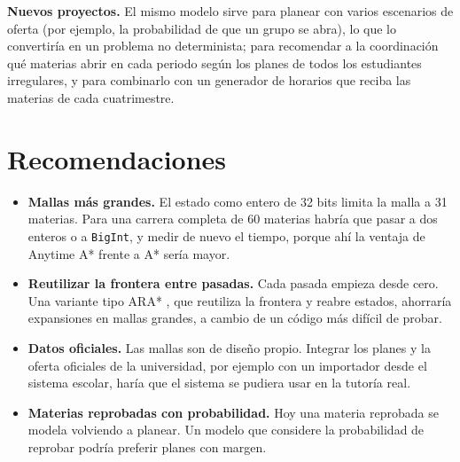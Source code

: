 \textbf{Nuevos proyectos.} El mismo modelo sirve para planear con varios escenarios de oferta (por ejemplo, la probabilidad de que un grupo se abra), lo que lo convertiría en un problema no determinista; para recomendar a la coordinación qué materias abrir en cada periodo según los planes de todos los estudiantes irregulares, y para combinarlo con un generador de horarios que reciba las materias de cada cuatrimestre.

\section{Recomendaciones}
\begin{itemize}
    \item \textbf{Mallas más grandes.} El estado como entero de 32 bits limita la malla a 31 materias. Para una carrera completa de 60 materias habría que pasar a dos enteros o a \texttt{BigInt}, y medir de nuevo el tiempo, porque ahí la ventaja de Anytime A* frente a A* sería mayor.
    \item \textbf{Reutilizar la frontera entre pasadas.} Cada pasada empieza desde cero. Una variante tipo ARA* \cite{likhachev2003}, que reutiliza la frontera y reabre estados, ahorraría expansiones en mallas grandes, a cambio de un código más difícil de probar.
    \item \textbf{Datos oficiales.} Las mallas son de diseño propio. Integrar los planes y la oferta oficiales de la universidad, por ejemplo con un importador desde el sistema escolar, haría que el sistema se pudiera usar en la tutoría real.
    \item \textbf{Materias reprobadas con probabilidad.} Hoy una materia reprobada se modela volviendo a planear. Un modelo que considere la probabilidad de reprobar podría preferir planes con margen.
\end{itemize}
